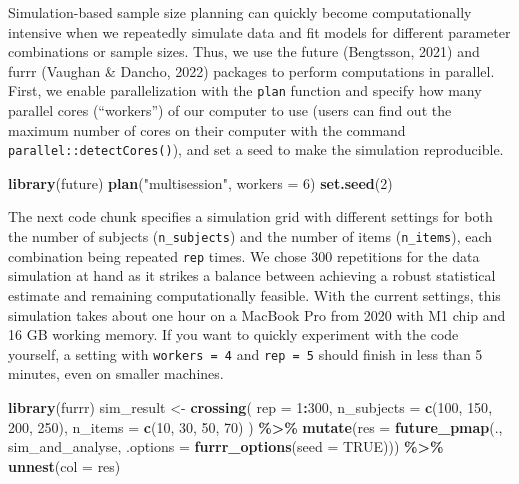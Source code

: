 \documentclass[
  man,floatsintext]{apa6}
\newenvironment{Shaded}{\begin{snugshade}}{\end{snugshade}}
\newcommand{\AttributeTok}[1]{\textcolor[rgb]{0.13,0.29,0.53}{#1}}
\newcommand{\ConstantTok}[1]{\textcolor[rgb]{0.56,0.35,0.01}{#1}}
\newcommand{\DecValTok}[1]{\textcolor[rgb]{0.00,0.00,0.81}{#1}}
\newcommand{\FunctionTok}[1]{\textcolor[rgb]{0.13,0.29,0.53}{\textbf{#1}}}
\newcommand{\NormalTok}[1]{#1}
\newcommand{\OtherTok}[1]{\textcolor[rgb]{0.56,0.35,0.01}{#1}}
\newcommand{\SpecialCharTok}[1]{\textcolor[rgb]{0.81,0.36,0.00}{\textbf{#1}}}
\newcommand{\StringTok}[1]{\textcolor[rgb]{0.31,0.60,0.02}{#1}}
\begin{document}
Simulation-based sample size planning can quickly become computationally intensive when we repeatedly simulate data and fit models for different parameter combinations or sample sizes. Thus, we use the future (Bengtsson, 2021) and furrr (Vaughan \& Dancho, 2022) packages to perform computations in parallel. First, we enable parallelization with the \texttt{plan} function and specify how many parallel cores (``workers'') of our computer to use (users can find out the maximum number of cores on their computer with the command \texttt{parallel::detectCores()}), and set a seed to make the simulation reproducible.

\begin{Shaded}
\begin{Highlighting}[]
\FunctionTok{library}\NormalTok{(future)}
\FunctionTok{plan}\NormalTok{(}\StringTok{"multisession"}\NormalTok{, }\AttributeTok{workers =} \DecValTok{6}\NormalTok{)}
\FunctionTok{set.seed}\NormalTok{(}\DecValTok{2}\NormalTok{)}
\end{Highlighting}
\end{Shaded}

The next code chunk specifies a simulation grid with different settings for both the number of subjects (\texttt{n\_subjects}) and the number of items (\texttt{n\_items}), each combination being repeated \texttt{rep} times.
We chose 300 repetitions for the data simulation at hand as it strikes a balance between achieving a robust statistical estimate and remaining computationally feasible.
With the current settings, this simulation takes about one hour on a MacBook Pro from 2020 with M1 chip and 16 GB working memory. If you want to quickly experiment with the code yourself, a setting with \texttt{workers\ =\ 4} and \texttt{rep\ =\ 5} should finish in less than 5 minutes, even on smaller machines.

\begin{Shaded}
\begin{Highlighting}[]
\FunctionTok{library}\NormalTok{(furrr)}
\NormalTok{sim\_result }\OtherTok{\textless{}{-}} \FunctionTok{crossing}\NormalTok{(}
  \AttributeTok{rep =} \DecValTok{1}\SpecialCharTok{:}\DecValTok{300}\NormalTok{,}
  \AttributeTok{n\_subjects =} \FunctionTok{c}\NormalTok{(}\DecValTok{100}\NormalTok{, }\DecValTok{150}\NormalTok{, }\DecValTok{200}\NormalTok{, }\DecValTok{250}\NormalTok{),}
  \AttributeTok{n\_items =} \FunctionTok{c}\NormalTok{(}\DecValTok{10}\NormalTok{, }\DecValTok{30}\NormalTok{, }\DecValTok{50}\NormalTok{, }\DecValTok{70}\NormalTok{)}
\NormalTok{) }\SpecialCharTok{\%\textgreater{}\%}
  \FunctionTok{mutate}\NormalTok{(}\AttributeTok{res =} \FunctionTok{future\_pmap}\NormalTok{(., sim\_and\_analyse, }
    \AttributeTok{.options =} \FunctionTok{furrr\_options}\NormalTok{(}\AttributeTok{seed =} \ConstantTok{TRUE}\NormalTok{))) }\SpecialCharTok{\%\textgreater{}\%}
  \FunctionTok{unnest}\NormalTok{(}\AttributeTok{col =}\NormalTok{ res)}
\end{Highlighting}
\end{Shaded}
\end{document}
